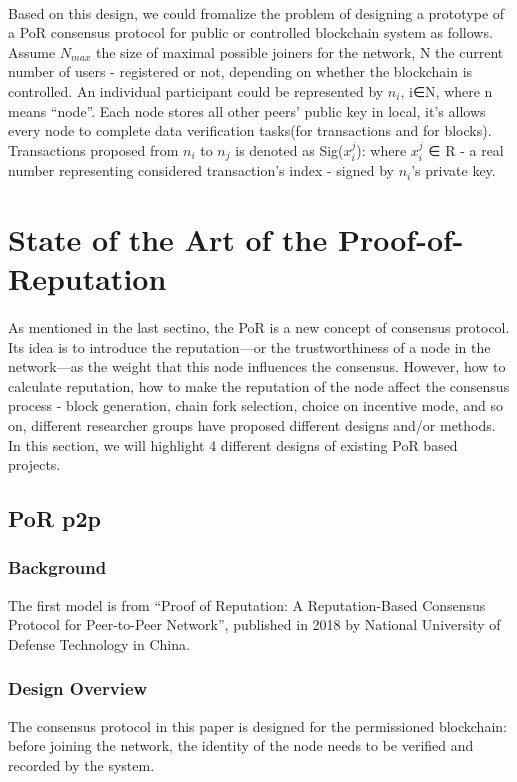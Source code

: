 \documentclass[]{article}
\begin{document}
\begin{CJK*}{UTF8}{gbsn}
\paragraph{} Based on this design, we could fromalize the problem of designing a prototype of a PoR consensus protocol for public or controlled blockchain system as follows. Assume $N_{max}$ the size of maximal possible joiners for the network, N the current number of users - registered or not, depending on whether the blockchain is controlled. An individual participant could be represented by $n_i$, i∈N, where n means ``node''. Each node stores all other peers' public key in local, it's allows every node to complete data verification tasks(for transactions and for blocks). Transactions proposed from $n_i$ to $n_j$ is denoted as
Sig($x_i^j$): where $x_i^j$ ∈ R - a real number representing considered transaction's index - signed by $n_i$'s private key. 

\section{State of the Art of the Proof-of-Reputation}
	\paragraph{} 
	As mentioned in the last sectino, the PoR is a new concept of consensus protocol. Its idea is to introduce the reputation—or the trustworthiness of a node in the network—as the weight that this node influences the consensus. However, how to calculate reputation, how to make the reputation of the node affect the consensus process - block generation, chain fork selection, choice on incentive mode, and so on, different researcher groups have proposed different designs and/or methods. In this section, we will highlight 4 different designs of existing PoR based projects.
	\subsection{PoR p2p} 
	\subsubsection*{Background} 
	The first model is from ``Proof of Reputation: A Reputation-Based Consensus Protocol for Peer-to-Peer Network'', published in 2018 by National University of Defense Technology in China. 
	\subsubsection*{Design Overview} 
	The consensus protocol in this paper is designed for the permissioned blockchain: before joining the network, the identity of the node needs to be verified and recorded by the system.

\end{CJK*}
\end{document}
